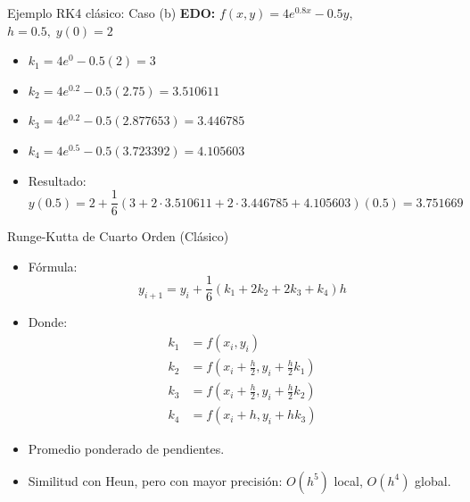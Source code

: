 \documentclass[main.tex]{subfiles}
\begin{document}
\begin{frame}{\small Ejemplo RK4 clásico: Caso (b)}
\textbf{EDO:} \( f(x, y) = 4e^{0.8x} - 0.5y \),\quad \( h = 0.5,\; y(0) = 2 \)
\begin{itemize}
  \item \( k_1 = 4e^{0} - 0.5(2) = 3 \)
  \item \( k_2 = 4e^{0.2} - 0.5(2.75) = 3.510611 \)
  \item \( k_3 = 4e^{0.2} - 0.5(2.877653) = 3.446785 \)
  \item \( k_4 = 4e^{0.5} - 0.5(3.723392) = 4.105603 \)
  \item Resultado:
  \[
    y(0.5) = 2 + \frac{1}{6}(3 + 2\cdot3.510611 + 2\cdot3.446785 + 4.105603)(0.5) = 3.751669
  \]
\end{itemize}
\end{frame}
\begin{frame}{\small Runge-Kutta de Cuarto Orden (Clásico)}
\begin{itemize}
  \item Fórmula:
  \[
    y_{i+1} = y_i + \frac{1}{6}(k_1 + 2k_2 + 2k_3 + k_4) h
  \]
  \item Donde:
  \begin{align*}
    k_1 &= f(x_i, y_i) \\
    k_2 &= f\left(x_i + \frac{h}{2}, y_i + \frac{h}{2}k_1\right) \\
    k_3 &= f\left(x_i + \frac{h}{2}, y_i + \frac{h}{2}k_2\right) \\
    k_4 &= f(x_i + h, y_i + h k_3)
  \end{align*}
  \item Promedio ponderado de pendientes.
  \item Similitud con Heun, pero con mayor precisión: \( O(h^5) \) local, \( O(h^4) \) global.
\end{itemize}
\end{frame}
\end{document}

